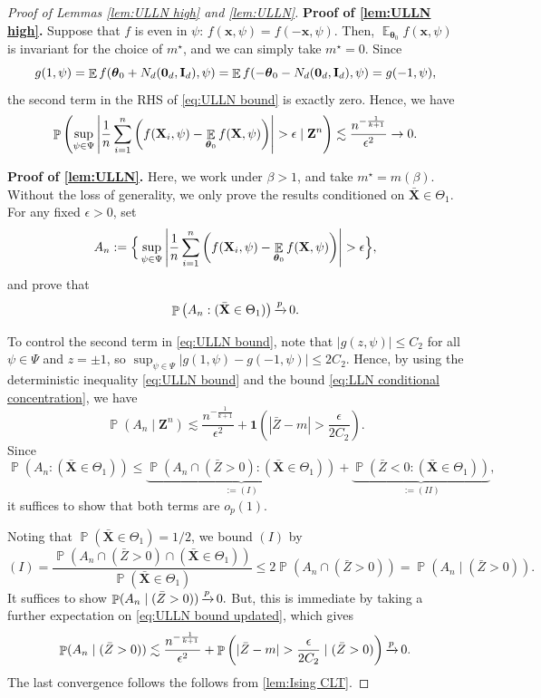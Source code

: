\documentclass[preprint,reqno]{imsart}
\newcommand{\ttheta}{\boldsymbol{\theta}}
\newcommand{\I}{\mathbf{I}_{\mathnormal{d}}}
\DeclareMathOperator{\xp}{\xrightarrow{\mathnormal p}}
\DeclareMathOperator{\EE}{\mathbb{E}}
\DeclareMathOperator{\PP}{\mathbb{P}}
\newcommand{\x}{\mathbf{x}}
\newcommand{\Z}{\mathbf{Z}}
\newcommand{\X}{\mathbf{X}}
\DeclareMathOperator{\sumin}{\sum_{\mathnormal i=1}^{\mathnormal n}}
\begin{document}
\begin{appendix}
\begin{proof}[Proof of Lemmas \ref{lem:ULLN high} and \ref{lem:ULLN}]
    \noindent \textbf{Proof of \cref{lem:ULLN high}.} Suppose that $f$ is even in $\psi$: $f(\x, \psi) = f(-\x, \psi)$. Then, $\EE_{\ttheta_0} f(\x, \psi)$ is invariant for the choice of $m^\star$, and we can simply take $m^\star = 0$. Since
    $$g(1, \psi) = \EE f(\ttheta_0 + N_d(\mathbf{0}_d, \I), \psi) = \EE f(-\ttheta_0 - N_d(\mathbf{0}_d, \I), \psi) = g(-1, \psi),$$
    the second term in the RHS of \eqref{eq:ULLN bound} is exactly zero.
    Hence, we have
    \begin{equation}
        \PP \left(\sup_{\psi \in \Psi} \left| \frac{1}{n} \sumin \left( f(\X_i, \psi) -\EE_{\ttheta_0} f(\X, \psi) \right) \right| > \epsilon \mid \Z^n \right) \lesssim \frac{n^{-\frac{1}{k+1} }}{\epsilon^2} \to 0.
    \end{equation}

     \noindent \textbf{Proof of \cref{lem:ULLN}.}
     Here, we work under $\beta > 1$, and take $m^\star = m(\beta)$. Without the loss of generality, we only prove the results conditioned on $\bar{\X} \in \Theta_1$. For any fixed $\epsilon> 0$,  set $$A_n := \Big\{ \sup_{ \psi \in \Psi} \left| \frac{1}{n} \sumin \left( f(\X_i, \psi) -\EE_{\ttheta_0} f(\X, \psi) \right) \right| > \epsilon \Big\},$$ and prove that     
     $$\PP \left(A_n: (\bar{\X} \in \Theta_1) \right) \xp 0.$$

     To control the second term in \eqref{eq:ULLN bound}, note that $|g(z, \psi)|\le C_2$ for all $\psi \in \Psi$ and $z = \pm 1$, so 
    $\sup_{\psi \in \Psi} |g(1,\psi) - g(-1, \psi)| \le 2 C_2$. Hence, by using the deterministic inequality \eqref{eq:ULLN bound} and the bound \eqref{eq:LLN conditional concentration}, we have
    \begin{equation}\label{eq:ULLN bound updated}
        \PP \left(A_n \mid \Z^n \right) \lesssim \frac{n^{-\frac{1}{k+1} }}{\epsilon^2} + \mathbf{1} \left(|\bar{Z} - m| > \frac{\epsilon}{2C_2} \right).
    \end{equation} 
    Since
    $$\PP(A_n : (\bar{\X} \in \Theta_1)) \le \underbrace{\PP(A_n \cap (\bar{Z} > 0) : (\bar{\X} \in \Theta_1) )}_{:=(I)} + \underbrace{\PP(\bar{Z} < 0 :(\bar{\X} \in \Theta_1) ) }_{:=(II)},$$
    it suffices to show that both terms are $o_p(1)$.

    Noting that $\PP(\bar{\X} \in \Theta_1) = 1/2$, we bound $(I)$ by
    $$(I) = \frac{\PP(A_n \cap (\bar{Z} > 0) \cap (\bar{\X} \in \Theta_1))}{\PP(\bar{\X} \in \Theta_1)} \le 2\PP(A_n \cap (\bar{Z} > 0)) = \PP(A_n \mid (\bar{Z} > 0)).$$
    It suffices to show $\PP(A_n \mid (\bar{Z} > 0)) \xp 0.$
    But, this is immediate by taking a further expectation on \eqref{eq:ULLN bound updated}, which gives
    $$\PP(A_n \mid (\bar{Z} > 0)) \lesssim \frac{n^{-\frac{1}{k+1} }}{\epsilon^2} + \PP \left(|\bar{Z} - m| > \frac{\epsilon}{2 C_2} \mid (\bar{Z} > 0) \right) \xp 0.$$
    The last convergence follows the follows from \cref{lem:Ising CLT}.


\end{proof}
\end{appendix}
\end{document}
